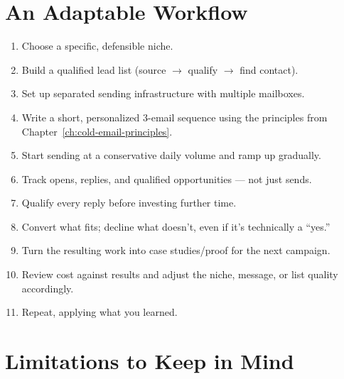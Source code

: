 \section{An Adaptable Workflow}

\begin{enumerate}
  \item Choose a specific, defensible niche.
  \item Build a qualified lead list (source $\to$ qualify $\to$ find contact).
  \item Set up separated sending infrastructure with multiple mailboxes.
  \item Write a short, personalized 3-email sequence using the principles from
  Chapter~\ref{ch:cold-email-principles}.
  \item Start sending at a conservative daily volume and ramp up gradually.
  \item Track opens, replies, and qualified opportunities — not just sends.
  \item Qualify every reply before investing further time.
  \item Convert what fits; decline what doesn't, even if it's technically a ``yes.''
  \item Turn the resulting work into case studies/proof for the next campaign.
  \item Review cost against results and adjust the niche, message, or list quality accordingly.
  \item Repeat, applying what you learned.
\end{enumerate}

\section{Limitations to Keep in Mind}

